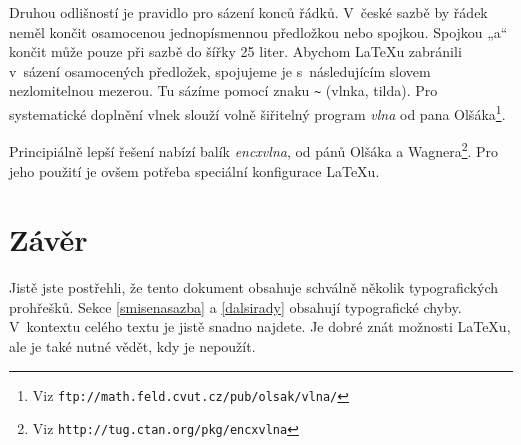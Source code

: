 \documentclass[10pt,a4paper,twocolumn]{article}
\begin{document}
Druhou odlišností je pravidlo pro sázení konců řádků. V~české
sazbě by řádek neměl končit osamocenou jednopísmennou
předložkou nebo spojkou. Spojkou „a“ končit může pouze při sazbě
do šířky 25 liter. Abychom \LaTeX u zabránili v~sázení osamocených
předložek, spojujeme je s~následujícím slovem nezlomitelnou
mezerou. Tu sázíme pomocí znaku \verb|~| (vlnka, tilda). Pro systematické
doplnění vlnek slouží volně šiřitelný program \emph{vlna} od pana
Olšáka\footnote{Viz \texttt{ftp://math.feld.cvut.cz/pub/olsak/vlna/}}.

Principiálně lepší řešení nabízí balík \emph{encxvlna}, od pánů
Olšáka a Wagnera\footnote{Viz \texttt{http://tug.ctan.org/pkg/encxvlna}}. Pro
jeho použití je ovšem potřeba speciální konfigurace \LaTeX u.


\section{Závěr}

Jistě jste postřehli, že tento dokument obsahuje schválně několik
typografických prohřešků. Sekce \ref{smisenasazba} a
\ref{dalsirady} obsahují typografické chyby. V~kontextu celého textu
je jistě snadno najdete. Je dobré znát možnosti \LaTeX u, ale je
také nutné vědět, kdy je nepoužít.
\end{document}
